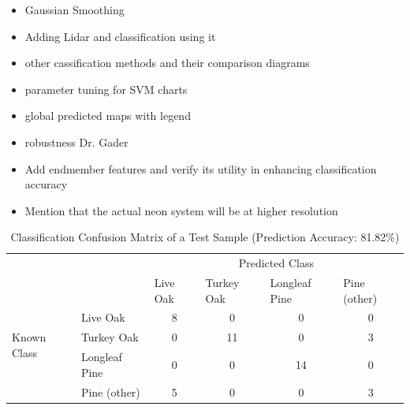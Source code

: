 \documentclass[remotesensing,article,accept,moreauthors,pdftex,12pt,a4paper]{mdpi}
\begin{document}
\begin{itemize}
\item Gaussian Smoothing
\item Adding Lidar and classification using it
\item other cassification methods and their comparison diagrams
\item parameter tuning for SVM charts
\item global predicted maps with legend
\item robustness Dr. Gader

\item Add endmember features and verify its utility in enhancing classification accuracy
\item Mention that the actual neon system will be at higher resolution
\end{itemize}



\begin{table}[t]
\begin{center}

\begin{tabular}{llllll}
                                       &                       & \multicolumn{4}{c}{Predicted Class}                                                                          \\ \cline{3-6} 
                                       & \multicolumn{1}{l|}{} & \multicolumn{1}{l|}{Live Oak} & \multicolumn{1}{l|}{Turkey Oak} & \multicolumn{1}{l|}{Longleaf Pine} & \multicolumn{1}{l|}{Pine (other)} \\ \cline{2-6} 
\multicolumn{1}{l|}{\multirow{3}{*}{\begin{sideways}Known Class\end{sideways}}} & \multicolumn{1}{l|}{Live Oak}      & \multicolumn{1}{c|}{8} & \multicolumn{1}{c|}{0} & \multicolumn{1}{c|}{0} & \multicolumn{1}{c|}{0} \\ \cline{2-6} 
\multicolumn{1}{l|}{}                                                           & \multicolumn{1}{l|}{Turkey Oak}    & \multicolumn{1}{c|}{0} & \multicolumn{1}{c|}{11} & \multicolumn{1}{c|}{0} & \multicolumn{1}{c|}{3} \\ \cline{2-6} 
\multicolumn{1}{l|}{}                                                           & \multicolumn{1}{l|}{Longleaf Pine} & \multicolumn{1}{c|}{0} & \multicolumn{1}{c|}{0} & \multicolumn{1}{c|}{14} & \multicolumn{1}{c|}{0} \\ \cline{2-6} 
\multicolumn{1}{l|}{}                                                           & \multicolumn{1}{l|}{Pine (other)}  & \multicolumn{1}{c|}{5} & \multicolumn{1}{c|}{0} & \multicolumn{1}{c|}{0} & \multicolumn{1}{c|}{3} \\ \cline{2-6} 
\end{tabular}
 \caption{Classification Confusion Matrix of a Test Sample (Prediction Accuracy: 81.82\%)}
    \label{table:confusion matrix}\end{center}
\end{table}
\end{document}
